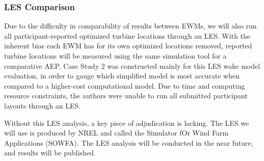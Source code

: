 \subsubsection{LES Comparison}

Due to the difficulty in comparability of results between EWMs, we will also run all participant-reported optimized turbine locations through an LES.
With the inherent bias each EWM has for its own optimized locations removed, reported turbine locations will be measured using the same simulation tool for a comparative AEP.
Case Study 2 was constructed mainly for this LES wake model evaluation, in order to gauge which simplified model is most accurate when compared to a higher-cost computational model.
Due to time and computing resource constraints, the authors were unable to run all submitted participant layouts through an LES.

Without this LES analysis, a key piece of adjudication is lacking.
The LES we will use is produced by NREL and called the Simulator fOr Wind Farm Applications (SOWFA)\cite{}.
The LES analysis will be conducted in the near future, and results will be published.